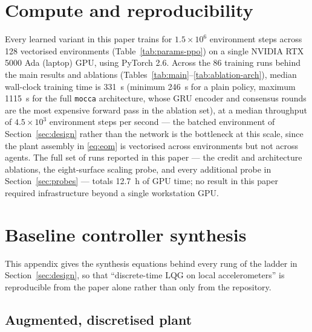 \documentclass[preprint,11pt,authoryear]{elsarticle}
\begin{document}
\section{Compute and reproducibility}
\label{app:compute}

Every learned variant in this paper trains for $1.5{\times}10^6$ environment
steps across 128 vectorised environments (Table~\ref{tab:params-ppo}) on a
single NVIDIA RTX 5000 Ada (laptop) GPU, using PyTorch 2.6. Across the 86
training runs behind the main results and ablations
(Tables~\ref{tab:main}--\ref{tab:ablation-arch}), median wall-clock training
time is \SI{331}{\second} (minimum \SI{246}{\second} for a plain policy,
maximum \SI{1115}{\second} for the full \texttt{mocca} architecture, whose
GRU encoder and consensus rounds are the most expensive forward pass in the
ablation set), at a median throughput of
$4.5{\times}10^3$ environment steps per second --- the batched environment of
Section~\ref{sec:design} rather than the network is the bottleneck at this
scale, since the plant assembly in \eqref{eq:eom} is vectorised across
environments but not across agents. The full set of runs reported in this paper --- the credit and architecture
ablations, the eight-surface scaling probe, and every additional probe in
Section~\ref{sec:probes} --- totals \SI{12.7}{\hour} of GPU time; no result in
this paper required infrastructure beyond a single workstation GPU.

\section{Baseline controller synthesis}
\label{app:baselines}

This appendix gives the synthesis equations behind every rung of the ladder in
Section~\ref{sec:design}, so that ``discrete-time LQG on local accelerometers''
is reproducible from the paper alone rather than only from the repository.

\subsection{Augmented, discretised plant}
\end{document}
